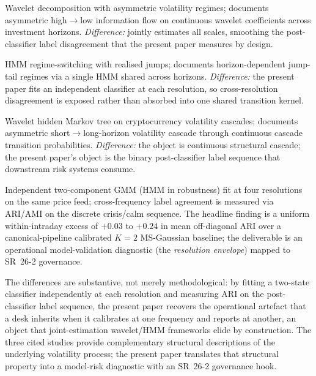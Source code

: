 \documentclass[preprint,12pt,authoryear]{elsarticle}
\begin{document}
\begin{description}\setlength\itemsep{4pt}
\item[\citet{GencaySelcukGradojevicWhitcher2010}.] Wavelet decomposition with asymmetric volatility regimes; documents asymmetric high$\to$low information flow on continuous wavelet coefficients across investment horizons. \emph{Difference:} jointly estimates all scales, smoothing the post-classifier label disagreement that the present paper measures by design.

\item[\citet{ErdemliogluGradojevic2021}.] HMM regime-switching with realised jumps; documents horizon-dependent jump-tail regimes via a single HMM shared across horizons. \emph{Difference:} the present paper fits an independent classifier at each resolution, so cross-resolution disagreement is exposed rather than absorbed into one shared transition kernel.

\item[\citet{GradojevicTsiakas2021}.] Wavelet hidden Markov tree on cryptocurrency volatility cascades; documents asymmetric short$\to$long-horizon volatility cascade through continuous cascade transition probabilities. \emph{Difference:} the object is continuous structural cascade; the present paper's object is the binary post-classifier label sequence that downstream risk systems consume.

\item[\textbf{This paper.}] Independent two-component GMM (HMM in robustness) fit at four resolutions on the same price feed; cross-frequency label agreement is measured via ARI/AMI on the discrete crisis/calm sequence. The headline finding is a uniform within-intraday excess of $+0.03$ to $+0.24$ in mean off-diagonal ARI over a canonical-pipeline calibrated $K{=}2$ MS-Gaussian baseline; the deliverable is an operational model-validation diagnostic (the \emph{resolution envelope}) mapped to SR~26-2 governance.
\end{description}

\noindent The differences are substantive, not merely methodological: by fitting a two-state classifier independently at each resolution and measuring ARI on the post-classifier label sequence, the present paper recovers the operational artefact that a desk inherits when it calibrates at one frequency and reports at another, an object that joint-estimation wavelet/HMM frameworks elide by construction. The three cited studies provide complementary structural descriptions of the underlying volatility process; the present paper translates that structural property into a model-risk diagnostic with an SR~26-2 governance hook.
\end{document}
